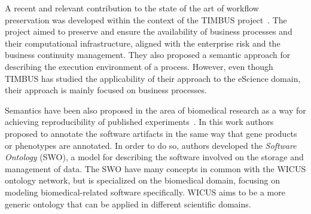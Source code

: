 A recent and relevant contribution to the state of the art of workflow preservation was developed within the context of the TIMBUS project~\cite{Mayer2014Ontologies}. The project  aimed to preserve and ensure the availability of business processes and their computational infrastructure, aligned with the enterprise risk and the business continuity management. They also proposed a semantic approach for describing the execution environment of a process.  However, even though TIMBUS has studied the applicability of their approach to the eScience domain, their approach is mainly focused on business processes.

Semantics have been also proposed in the area of biomedical research as a way for achieving reproducibility of published experiments~\cite{MaloneSWO2014}. In this work authors proposed to annotate the software artifacts in the same way that gene products or phenotypes are annotated. In order to do so, authors developed the {\it Software Ontology} (SWO), a model for describing the software involved on the storage and management of data. The SWO have many concepts in common with the WICUS ontology  network, but is specialized on the biomedical domain, focusing on modeling biomedical-related software specifically. WICUS aims to be a more generic ontology that can be applied in different scientific domains.


